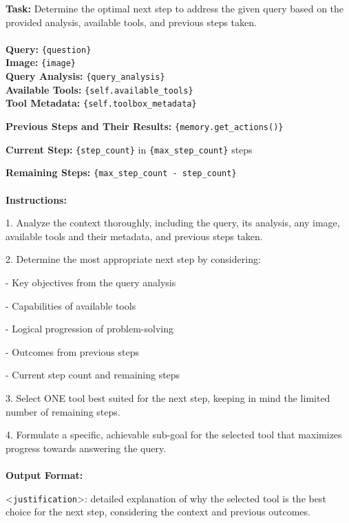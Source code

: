 \begin{textcolorbox}
\textbf{Task:} Determine the optimal next step to address the given query based on the provided analysis, available tools, and previous steps taken.
\\\\
\textbf{Query:} \texttt{\{question\}}
\\
\textbf{Image:} \texttt{\{image\}}
\\
\textbf{Query Analysis:} \texttt{\{query\_analysis\}}
\\
\textbf{Available Tools:}
\texttt{\{self.available\_tools\}}
\\
\textbf{Tool Metadata:}
\texttt{\{self.toolbox\_metadata\}}

\textbf{Previous Steps and Their Results:}
\texttt{\{memory.get\_actions()\}}

\textbf{Current Step:} \texttt{\{step\_count\}} in \texttt{\{max\_step\_count\}} steps

\textbf{Remaining Steps:} \texttt{\{max\_step\_count - step\_count\}}
\\\\
\textbf{Instructions:}

1. Analyze the context thoroughly, including the query, its analysis, any image, available tools and their metadata, and previous steps taken.

2. Determine the most appropriate next step by considering:

\quad - Key objectives from the query analysis
   
\quad - Capabilities of available tools
   
\quad - Logical progression of problem-solving
   
\quad - Outcomes from previous steps
   
\quad - Current step count and remaining steps

3. Select ONE tool best suited for the next step, keeping in mind the limited number of remaining steps.

4. Formulate a specific, achievable sub-goal for the selected tool that maximizes progress towards answering the query.
\\\\
\textbf{Output Format:}

\textless{}\texttt{justification}\textgreater{}: detailed explanation of why the selected tool is the best choice for the next step, considering the context and previous outcomes.


\end{textcolorbox}
